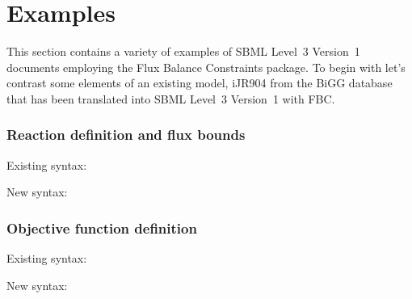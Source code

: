 
\section{Examples}
\label{examples}

This section contains a variety of examples of SBML Level~3 Version~1
documents employing the Flux Balance Constraints package. To begin with let's contrast some elements of an existing model, iJR904 from the \textsf{BiGG} database \cite{ijr904, bigg} that has been translated into SBML Level~3 Version~1 with FBC.

\subsubsection*{Reaction definition and flux bounds}
Existing syntax:

New syntax:
\newpage
{}

\subsubsection*{Objective function definition}
Existing syntax:

New syntax:

